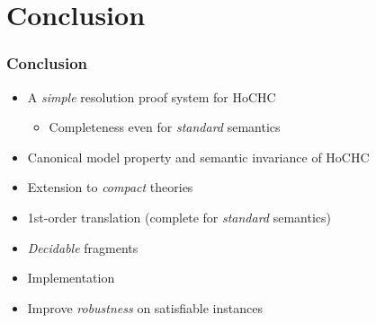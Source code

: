 \documentclass{beamer}
\begin{document}
\begin{frame}[label=outline]
    
\end{frame}


\section{Conclusion}
\begin{frame}
  \frametitle{Conclusion}
  \begin{itemize}
  \item A \emph{simple} resolution proof system for HoCHC
    \begin{itemize}
    \item Completeness even for \emph{standard} semantics
    \end{itemize}
  \item Canonical model property and semantic invariance of HoCHC
  \end{itemize}
  \begin{itemize}
  \item Extension to \emph{compact} theories
  \item 1st-order translation (complete for \emph{standard}
    semantics)
  \item \emph{Decidable} fragments
  \end{itemize}
  \begin{itemize}
  \item Implementation
  \item Improve \textit{robustness} on satisfiable instances
  \end{itemize}
  \vspace{15pt}
\end{frame}

\end{document}
